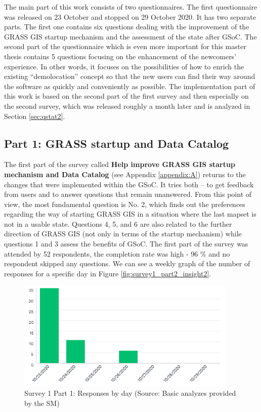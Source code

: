 \documentclass[a4paper,10pt,twoside]{article}
\begin{document}
\noindent The main part of this work consists of two
questionnaires. The first questionnaire was released on 23 October and
stopped on 29 October 2020. It has two separate parts. The first one
contains six questions dealing with the improvement of the GRASS GIS
startup mechanism and the assessment of the state after GSoC. The
second part of the questionnaire which is even more important for this master
thesis contains 5 questions focusing on the enhancement of the
newcomers' experience. In other words, it focuses on the possibilities of
how to enrich the existing ``demolocation'' concept so that the new
users can find their way around the software as quickly and
conveniently as possible. The implementation part of this work is
based on the second part of the first survey and then especially on
the second survey, which was released roughly a month later and is
analyzed in Section \ref{sec:qstat2}.

\subsection{Part 1: GRASS startup and Data Catalog}

\noindent The first part of the survey called \textbf {Help improve
  GRASS GIS startup mechanism and Data Catalog} 
  (see Appendix \ref{appendix:A}) returns to the changes
that were implemented within the GSoC. It tries both -- to get feedback
from users and to answer questions that remain unanswered. 
From this point of view, the most fundamental question is No. 2,
which finds out the preferences regarding the way of starting GRASS
GIS in a situation where the last mapset is not in a usable
state. Questions 4, 5, and 6 are also related to the further direction
of GRASS GIS (not only in terms of the startup mechanism) while
questions 1 and 3 assess the benefits of GSoC. The first part of the
survey was attended by 52 respondents, the completion rate was high -
96 \% and no respondent skipped any questions. We can see a weekly
graph of the number of responses for a specific day in Figure
\ref{fig:survey1_part2_insight2}.

\begin{figure}[hbt!] 
\begin{center}
\includegraphics[width=10.5cm]{../surveys/analyzed_data/survey1_part1_insight2.png} 
\caption[Survey 1 Part 1: Responses by day]{Survey 1 Part 1: Responses by day (Source: Basic analyzes provided by the SM)}
\label{fig:survey1_part1_insight2}
\end{center}
\end{figure}
\end{document}
